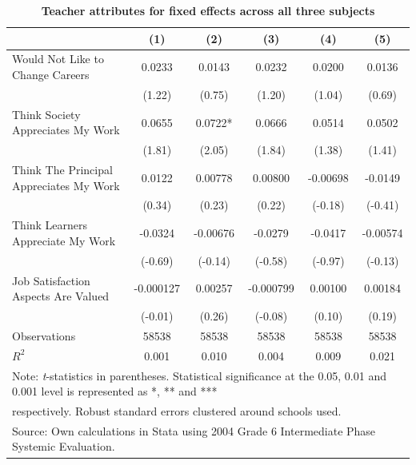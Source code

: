 \documentclass[12pt,preprint, authoryear]{article}
\numberwithin{equation}{section}
\numberwithin{figure}{section}
\numberwithin{table}{section}
\begin{document}
\begin{longtable}[htbp] {p{8cm}*{5}{c}} \caption{
\textbf{Teacher attributes for fixed effects across all three subjects}} \label{tab:FE} \\ \hline\hline
                &\multicolumn{1}{c}{(1)}&\multicolumn{1}{c}{(2)}&\multicolumn{1}{c}{(3)}&\multicolumn{1}{c}{(4)}&\multicolumn{1}{c}{(5)}\\
\hline
Would Not Like to Change Careers&   0.0233         &   0.0143         &   0.0232         &   0.0200         &   0.0136         \\
                &   (1.22)         &   (0.75)         &   (1.20)         &   (1.04)         &   (0.69)         \\

Think Society Appreciates My Work&   0.0655         &   0.0722*  &   0.0666         &   0.0514         &   0.0502         \\
                &   (1.81)         &   (2.05)         &   (1.84)         &   (1.38)         &   (1.41)         \\

Think The Principal Appreciates My Work&   0.0122         &  0.00778         &  0.00800         & -0.00698         &  -0.0149         \\
                &   (0.34)         &   (0.23)         &   (0.22)         &  (-0.18)         &  (-0.41)         \\

Think Learners Appreciate My Work&  -0.0324         & -0.00676         &  -0.0279         &  -0.0417         & -0.00574         \\
                &  (-0.69)         &  (-0.14)         &  (-0.58)         &  (-0.97)         &  (-0.13)         \\

Job Satisfaction Aspects Are Valued&-0.000127         &  0.00257         &-0.000799         &  0.00100         &  0.00184         \\
                &  (-0.01)         &   (0.26)         &  (-0.08)         &   (0.10)         &   (0.19)         \\ \hline
Observations    &    58538         &    58538         &    58538         &    58538         &    58538         \\
\(R^{2}\)       &    0.001         &    0.010         &    0.004         &    0.009         &    0.021         \\
\hline\hline
\multicolumn{6}{l}{Note: \textit{t}-statistics in parentheses. Statistical significance at the 0.05, 0.01 and 0.001 level is represented as *, ** and ***} \\
\multicolumn{6}{l}{ respectively. Robust standard errors clustered around schools used.}\\
\multicolumn{6}{l}{Source: Own calculations in Stata using 2004 Grade 6 Intermediate Phase Systemic Evaluation.}\\
\end{longtable}
\end{document}
